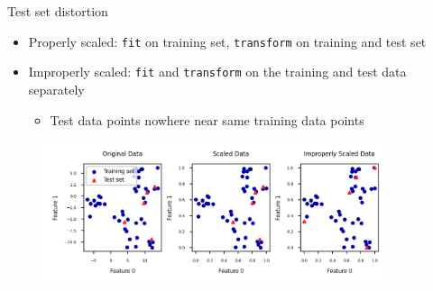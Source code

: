 


\begin{frame}{Test set distortion}
    \begin{itemize}
        \item Properly scaled: \texttt{fit} on training set, \texttt{transform} on training and test set
        \item Improperly scaled: \texttt{fit} and \texttt{transform} on the training and test data separately
        \begin{itemize}
            \item Test data points nowhere near same training data points
        \end{itemize}
    \end{itemize}

    \begin{figure}
        \centering
        \includegraphics[width=0.9\textwidth,keepaspectratio]{images/pre-processing/distortion_1.png}
    \end{figure}
\end{frame}



